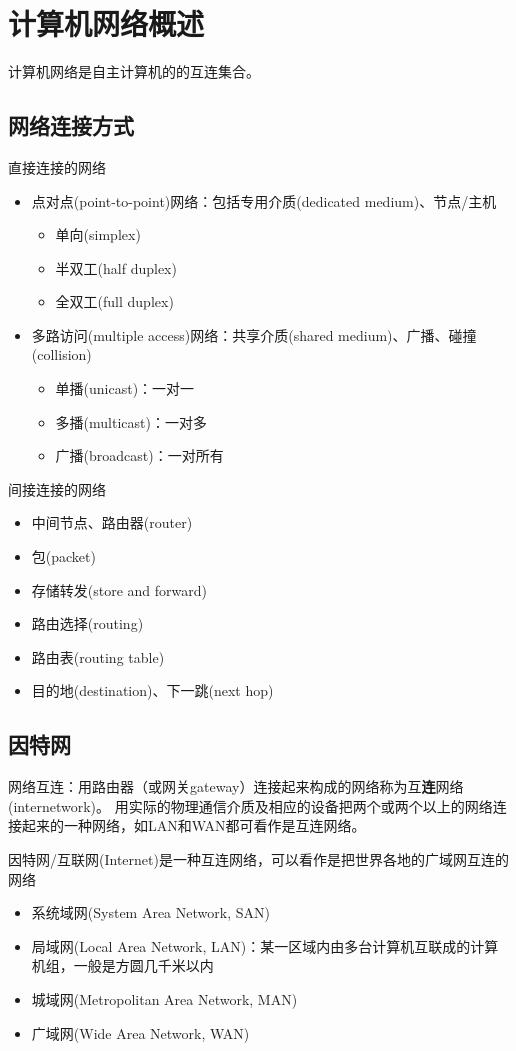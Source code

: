 
\section{计算机网络概述}
计算机网络是自主计算机的的互连集合。

\subsection{网络连接方式}
直接连接的网络
\begin{itemize}
\item 点对点(point-to-point)网络：包括专用介质(dedicated medium)、节点/主机
\begin{itemize}
	\item 单向(simplex)
	\item 半双工(half duplex)
	\item 全双工(full duplex)
\end{itemize}
\item 多路访问(multiple access)网络：共享介质(shared medium)、广播、碰撞(collision)
\begin{itemize}
	\item 单播(unicast)：一对一
	\item 多播(multicast)：一对多
	\item 广播(broadcast)：一对所有
\end{itemize}
\end{itemize}

间接连接的网络
\begin{itemize}
	\item 中间节点、路由器(router)
	\item 包(packet)
	\item 存储转发(store and forward)
	\item 路由选择(routing)
	\item 路由表(routing table)
	\item 目的地(destination)、下一跳(next hop)
\end{itemize}

\subsection{因特网}
网络互连：用路由器（或网关gateway）连接起来构成的网络称为互\textbf{连}网络(internetwork)。
用实际的物理通信介质及相应的设备把两个或两个以上的网络连接起来的一种网络，如LAN和WAN都可看作是互连网络。

因特网/互联网(Internet)是一种互连网络，可以看作是把世界各地的广域网互连的网络
\begin{itemize}
	\item 系统域网(System Area Network, SAN)
	\item 局域网(Local Area Network, LAN)：某一区域内由多台计算机互联成的计算机组，一般是方圆几千米以内
	\item 城域网(Metropolitan Area Network, MAN)
	\item 广域网(Wide Area Network, WAN)
\end{itemize}


